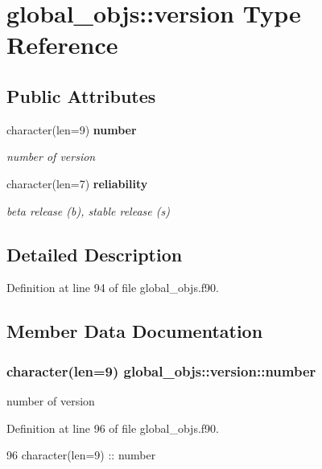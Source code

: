 \section{global\+\_\+objs\+:\+:version Type Reference}
\label{structglobal__objs_1_1version}
\subsection*{Public Attributes}
\begin{DoxyCompactItemize}
\item 
character(len=9) {\bf number}
\begin{DoxyCompactList}\small\item\em number of version \end{DoxyCompactList}\item 
character(len=7) {\bf reliability}
\begin{DoxyCompactList}\small\item\em beta release (b), stable release (s) \end{DoxyCompactList}\end{DoxyCompactItemize}


\subsection{Detailed Description}


Definition at line 94 of file global\+\_\+objs.\+f90.



\subsection{Member Data Documentation}
\subsubsection[{number}]{\setlength{\rightskip}{0pt plus 5cm}character(len=9) global\+\_\+objs\+::version\+::number}\label{structglobal__objs_1_1version_ad8646903ea507c19335657f0f1fa0b56}


number of version 



Definition at line 96 of file global\+\_\+objs.\+f90.


\begin{DoxyCode}
96     \textcolor{keywordtype}{character(len=9)} :: number
\end{DoxyCode}
